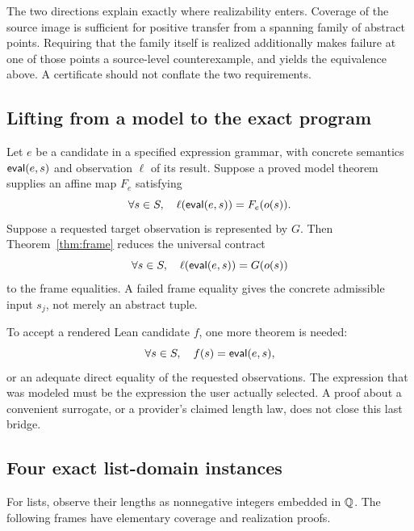 \documentclass[11pt,letterpaper]{article}
\theoremstyle{definition}\newtheorem{definition}[theorem]{Definition}
\theoremstyle{remark}\newtheorem{remark}[theorem]{Remark}
\begin{document}
The two directions explain exactly where realizability enters. Coverage of the
source image is sufficient for positive transfer from a spanning family of
abstract points. Requiring that the family itself is realized additionally
makes failure at one of those points a source-level counterexample, and yields
the equivalence above. A certificate should not conflate the two requirements.

\subsection{Lifting from a model to the exact program}
Let $e$ be a candidate in a specified expression grammar, with concrete
semantics $\mathsf{eval}(e,s)$ and observation $\ell$ of its result. Suppose a proved
model theorem supplies an affine map $F_e$ satisfying
\begin{equation}\label{eq:model-bridge}
 \forall s\in S,\quad \ell(\mathsf{eval}(e,s))=F_e(o(s)).
\end{equation}
Suppose a requested target observation is represented by $G$. Then
Theorem~\ref{thm:frame} reduces the universal contract
\[
 \forall s\in S,\quad\ell(\mathsf{eval}(e,s))=G(o(s))
\]
to the frame equalities. A failed frame equality gives the concrete admissible
input $s_j$, not merely an abstract tuple.

To accept a rendered Lean candidate $f$, one more theorem is needed:
\[
 \forall s\in S,\quad f(s)=\mathsf{eval}(e,s),
\]
or an adequate direct equality of the requested observations. The expression
that was modeled must be the expression the user actually selected. A proof
about a convenient surrogate, or a provider's claimed length law, does not
close this last bridge.

\subsection{Four exact list-domain instances}
For lists, observe their lengths as nonnegative integers embedded in $\mathbb Q$.
The following frames have elementary coverage and realization proofs.
\end{document}
